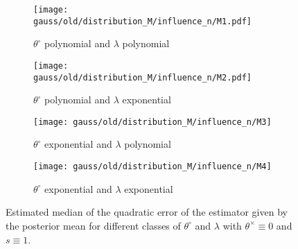 \begin{figure}
\centering
\begin{subfigure}{.5\textwidth}
  \centering
  \texttt{[image: gauss/old/distribution\_M/influence\_n/M1.pdf]}
  \caption{$\theta^{\circ}$ polynomial and $\lambda$ polynomial}
  \label{fig3:sub1}
\end{subfigure}%
\begin{subfigure}{.5\textwidth}
  \centering
  \texttt{[image: gauss/old/distribution\_M/influence\_n/M2.pdf]}
  \caption{$\theta^{\circ}$ polynomial and $\lambda$ exponential}
  \label{fig3:sub2}
\end{subfigure}
\begin{subfigure}{.5\textwidth}
  \centering
  \texttt{[image: gauss/old/distribution\_M/influence\_n/M3]}
  \caption{$\theta^{\circ}$ exponential and $\lambda$ polynomial}
  \label{fig3:sub3}
\end{subfigure}%
\begin{subfigure}{.5\textwidth}
  \centering
  \texttt{[image: gauss/old/distribution\_M/influence\_n/M4]}
  \caption{$\theta^{\circ}$ exponential and $\lambda$ exponential}
  \label{fig3:sub4}
\end{subfigure}
\caption{Estimated median of the quadratic error of the estimator given by the posterior mean for different classes of $\theta^{\circ}$ and $\lambda$ with $\theta^{\times} \equiv 0$ and $s \equiv 1$.}
\label{EQM}
\end{figure}






